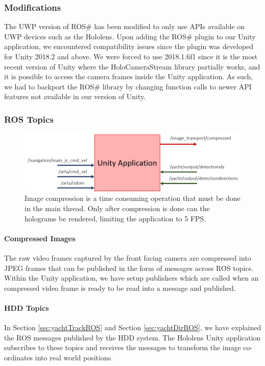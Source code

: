 \subsubsection{Modifications} The UWP version of ROS\# has been modified to only use APIs available on UWP devices such as the Hololens. Upon adding the ROS\# plugin to our Unity application, we encountered compatibility issues since the plugin was developed for Unity 2018.2 and above. We were forced to use 2018.1.6f1 since it is the most recent version of Unity where the HoloCameraStream library partially works, and it is possible to access the camera frames inside the Unity application. As such, we had to backport the ROS\# library by changing function calls to newer API features not available in our version of Unity.

\subsubsection{ROS Topics}

\begin{figure}[ht]
	\centering
	\includegraphics[width=1.0\linewidth]{img/chapter5_implementation/holoROSTopics.png}
	\caption{Image compression is a time consuming operation that must be done in the main thread. Only after compression is done can the holograms be rendered, limiting the application to 5 FPS.}
	\label{fig:unityThreads}
\end{figure}

\paragraph{Compressed Images} The raw video frames captured by the front facing camera are compressed into JPEG frames that can be published in the form of  messages across ROS topics. Within the Unity application, we have setup  publishers which are called when an compressed video frame is ready to be read into a message and published.

\paragraph{HDD Topics} In Section \ref{sec:yachtTrackROS} and Section \ref{sec:yachtDirROS}, we have explained the ROS messages published by the HDD system. The Hololens Unity application subscribes to these topics and receives the messages to transform the image co-ordinates into real world positions.



